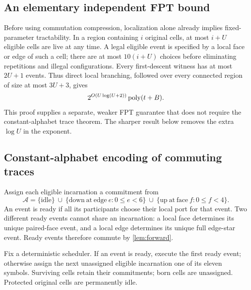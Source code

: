 \subsection{An elementary independent FPT bound}

Before using commutation compression, localization alone already implies
fixed-parameter tractability. In a region containing $i$ original cells,
at most $i+U$ eligible cells are live at any time. A legal eligible event
is specified by a local face or edge of such a cell; there are at most
$10(i+U)$ choices before eliminating repetitions and illegal configurations.
Every first-descent witness has at most $2U+1$ events. Thus direct local
branching, followed over every connected region of size at most $3U+3$,
gives
\begin{equation}\label{eq:elementary-fpt}
 2^{O(U\log(U+2))}\operatorname{poly}(t+B).
\end{equation}
This proof supplies a separate, weaker FPT guarantee that does not require
the constant-alphabet trace theorem. The sharper result below removes the
extra $\log U$ in the exponent.

\subsection{Constant-alphabet encoding of commuting traces}

Assign each eligible incarnation a commitment from
\begin{equation}\label{eq:alphabet}
 \mathcal A=\{\mathrm{idle}\}\ \cup\
 \{\mathrm{down\ at\ edge}\ e:0\le e<6\}\ \cup\
 \{\mathrm{up\ at\ face}\ f:0\le f<4\}.
\end{equation}
An event is ready if all its participants choose their local port for that
event. Two different ready events cannot share an incarnation: a local face
determines its unique paired-face event, and a local edge determines its
unique full edge-star event. Ready events therefore commute by
\cref{lem:forward}.

Fix a deterministic scheduler. If an event is ready, execute the first ready
event; otherwise assign the next unassigned eligible incarnation one of its
eleven symbols. Surviving cells retain their commitments; born cells are
unassigned. Protected original cells are permanently idle.

